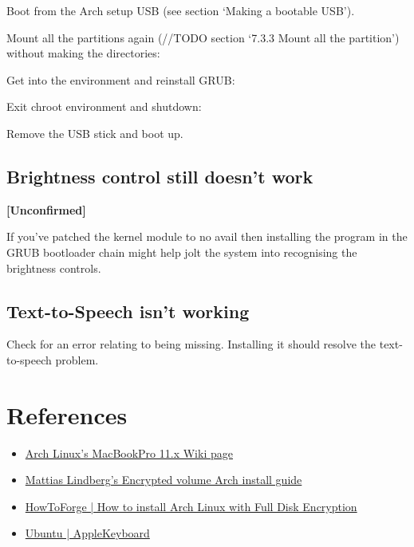Boot from the Arch setup USB (see section `Making a bootable USB').

Mount all the partitions again (//TODO section `7.3.3 Mount all the partition') without making the directories:


Get into the  environment and reinstall GRUB:


Exit chroot environment and shutdown:


Remove the USB stick and boot up.

\subsection{Brightness control still doesn't work}

\textbf{\textcolor{textgrey}{[Unconfirmed]}}

If you've patched the  kernel module to no avail then installing the \href{https://github.com/0xbb/apple\_set_os.efi}{} program in the GRUB bootloader chain might help jolt the system into recognising the brightness controls.

\subsection{Text-to-Speech isn't working}

Check  for an error relating to  being missing. Installing it should resolve the text-to-speech problem.


\clearpage
\section{References}

\begin{itemize}
	\item \href{https://wiki.archlinux.org/index.php/MacBookPro11,x#Using_the_MacBook.27s_native_EFI_bootloader_.28recommended.29}{Arch Linux's MacBookPro 11.x Wiki page}
	\item \href{https://gist.github.com/mattiaslundberg/8620837}{Mattias Lindberg's Encrypted volume Arch install guide}
	\item \href{https://www.howtoforge.com/tutorial/how-to-install-arch-linux-with-full-disk-encryption/}{HowToForge | How to install Arch Linux with Full Disk Encryption}
	\item \href{https://help.ubuntu.com/community/AppleKeyboard#Change_Function_Key_behavior}{Ubuntu | AppleKeyboard}
\end{itemize}


